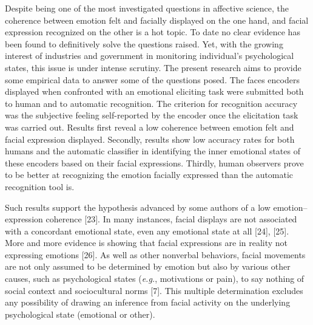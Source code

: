 \documentclass[conference,final,]{IEEEtran}
\begin{document}
Despite being one of the most investigated questions in affective
science, the coherence between emotion felt and facially displayed on
the one hand, and facial expression recognized on the other is a hot
topic. To date no clear evidence has been found to definitively solve
the questions raised. Yet, with the growing interest of industries and
government in monitoring individual's psychological states, this issue
is under intense scrutiny. The present research aims to provide some
empirical data to answer some of the questions posed. The faces encoders
displayed when confronted with an emotional eliciting task were
submitted both to human and to automatic recognition. The criterion for
recognition accuracy was the subjective feeling self-reported by the
encoder once the elicitation task was carried out. Results first reveal
a low coherence between emotion felt and facial expression displayed.
Secondly, results show low accuracy rates for both humans and the
automatic classifier in identifying the inner emotional states of these
encoders based on their facial expressions. Thirdly, human observers
prove to be better at recognizing the emotion facially expressed than
the automatic recognition tool is.

Such results support the hypothesis advanced by some authors of a low
emotion--expression coherence {[}23{]}. In many instances, facial
displays are not associated with a concordant emotional state, even any
emotional state at all {[}24{]}, {[}25{]}. More and more evidence is
showing that facial expressions are in reality not expressing emotions
{[}26{]}. As well as other nonverbal behaviors, facial movements are not
only assumed to be determined by emotion but also by various other
causes, such as psychological states (\emph{e.g.},
\nolinebreak motivations or pain), to say nothing of social context and
sociocultural norms {[}7{]}. This multiple determination excludes any
possibility of drawing an inference from facial activity on the
underlying psychological state (emotional or other).
\end{document}

